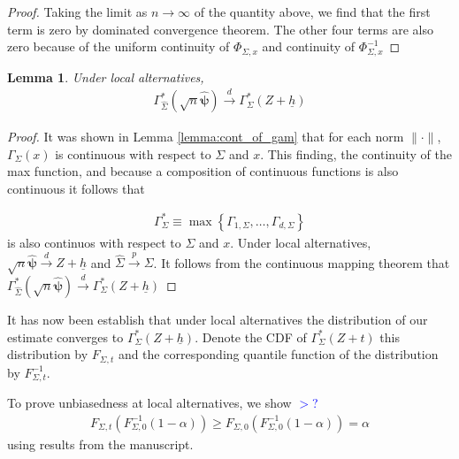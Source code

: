 \documentclass{article}
\newtheorem{lemma}[theorem]{Lemma}
\newcommand{\vmat}{\Sigma}
\newcommand{\rvv}{Z}
\begin{document}
\begin{proof}
Taking the limit as $n \to \infty$ of the quantity above, we find that the first term is zero by dominated convergence theorem.  The other four terms are also zero because of the uniform continuity of $\Phi_{\Sigma, x}$ and continuity of $\Phi^{-1}_{\Sigma, x}$
\end{proof}

\begin{lemma}
Under local alternatives, 
	\begin{align*}
		\Gamma^*_{\hat{\Sigma}}(\sqrt{n} \hat{\boldsymbol{\psi}}) \xrightarrow{d} \Gamma^*_{\Sigma}(Z + \underline{h}) 
	\end{align*}
\end{lemma}

\begin{proof}
	It was shown in Lemma \ref{lemma:cont_of_gam} that for each norm $\|\cdot\|$, $\Gamma_{\Sigma}(x)$ is continuous with respect to $\Sigma$ and $x$.  This finding, the continuity of the max function, and because a composition of continuous functions is also continuous it follows that

	\begin{align*}
		\Gamma^*_{\Sigma} \equiv \max\left\{\Gamma_{1, \Sigma}, \dots, \Gamma_{d, \Sigma}\right\}
	\end{align*}
	is also continuos with respect to $\Sigma$ and $x$. Under local alternatives, $\sqrt{n} \hat{\boldsymbol{\psi}} \xrightarrow{d} Z + \underline{h}$ and $\hat{\Sigma} \xrightarrow{p} \Sigma$.   It follows from the continuous mapping theorem that $\Gamma^*_{\hat{\Sigma}}(\sqrt{n} \hat{\boldsymbol{\psi}}) \xrightarrow{d} \Gamma^*_{\Sigma}(Z + \underline{h}) $
\end{proof}

It has now been establish that under local alternatives the distribution of our estimate converges to $\Gamma^*_{\Sigma}(Z + \underline{h})$.  Denote the CDF of $\Gamma^*_{\Sigma}(Z + t)$ this distribution by $F_{\Sigma, t}$ and the corresponding quantile function of the distribution by $F^{-1}_{\Sigma, t}$.  

To prove unbiasedness at local alternatives, we show \textcolor{blue}{$>$?}
\begin{align*}
	F_{\Sigma, t}(F^{-1}_{\Sigma, 0}(1 - \alpha)) \geq F_{\Sigma, 0}(F^{-1}_{\Sigma, 0}(1 - \alpha)) = \alpha
\end{align*}
using results from the \citep{anderson_integral_1955} manuscript.
\end{document}
